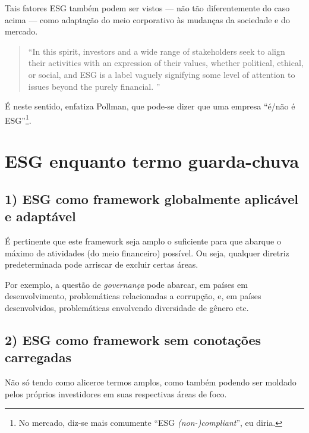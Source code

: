 \documentclass[12pt]{article}
\numberwithin{equation}{section}
\theoremstyle{plain}
\theoremstyle{definition}
\theoremstyle{remark}
\begin{document}
Tais fatores ESG também podem ser vistos --- não tão diferentemente do caso acima --- como adaptação do meio corporativo às mudanças da sociedade e do mercado.

\begin{quote}
``In this spirit, investors and a wide range of stakeholders seek to align their activities with an expression of their values, whether political, ethical, or social, and ESG is a label vaguely signifying some level of attention to issues beyond the purely financial. \parencite[, p. 27]{Pollman2022}''
\end{quote}

É neste sentido, enfatiza Pollman, que pode-se dizer que uma empresa ``é/não é ESG''\footnote{No mercado, diz-se mais comumente ``ESG \textit{(non-)compliant}'', eu diria.}.

\hypertarget{esg-enquanto-termo-guarda-chuva}{%
\section{ESG enquanto termo guarda-chuva}\label{esg-enquanto-termo-guarda-chuva}}

\hypertarget{esg-como-framework-globalmente-aplicuxe1vel-e-adaptuxe1vel}{%
\subsection{1) ESG como framework globalmente aplicável e adaptável}\label{esg-como-framework-globalmente-aplicuxe1vel-e-adaptuxe1vel}}

É pertinente que este framework seja amplo o suficiente para que abarque o máximo de atividades (do meio financeiro) possível. Ou seja, qualquer diretriz predeterminada pode arriscar de excluir certas áreas.

Por exemplo, a questão de \textit{governança} pode abarcar, em países em desenvolvimento, problemáticas relacionadas a corrupção, e, em países desenvolvidos, problemáticas envolvendo diversidade de gênero etc.

\hypertarget{esg-como-framework-sem-conotauxe7uxf5es-carregadas}{%
\subsection{2) ESG como framework sem conotações carregadas}\label{esg-como-framework-sem-conotauxe7uxf5es-carregadas}}

Não só tendo como alicerce termos amplos, como também podendo ser moldado pelos próprios investidores em suas respectivas áreas de foco.
\end{document}
